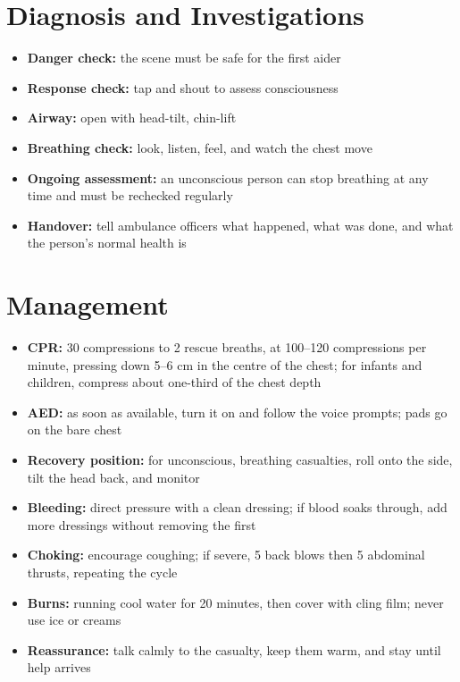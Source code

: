 \section*{Diagnosis and Investigations}
\begin{itemize}
    \item \textbf{Danger check:} the scene must be safe for the first aider
    \item \textbf{Response check:} tap and shout to assess consciousness
    \item \textbf{Airway:} open with head-tilt, chin-lift
    \item \textbf{Breathing check:} look, listen, feel, and watch the chest move
    \item \textbf{Ongoing assessment:} an unconscious person can stop breathing at any time and must be rechecked regularly
    \item \textbf{Handover:} tell ambulance officers what happened, what was done, and what the person's normal health is
\end{itemize}

\section*{Management}
\begin{itemize}
    \item \textbf{CPR:} 30 compressions to 2 rescue breaths, at 100--120 compressions per minute, pressing down 5--6 cm in the centre of the chest; for infants and children, compress about one-third of the chest depth
    \item \textbf{AED:} as soon as available, turn it on and follow the voice prompts; pads go on the bare chest
    \item \textbf{Recovery position:} for unconscious, breathing casualties, roll onto the side, tilt the head back, and monitor
    \item \textbf{Bleeding:} direct pressure with a clean dressing; if blood soaks through, add more dressings without removing the first
    \item \textbf{Choking:} encourage coughing; if severe, 5 back blows then 5 abdominal thrusts, repeating the cycle
    \item \textbf{Burns:} running cool water for 20 minutes, then cover with cling film; never use ice or creams
    \item \textbf{Reassurance:} talk calmly to the casualty, keep them warm, and stay until help arrives
\end{itemize}

